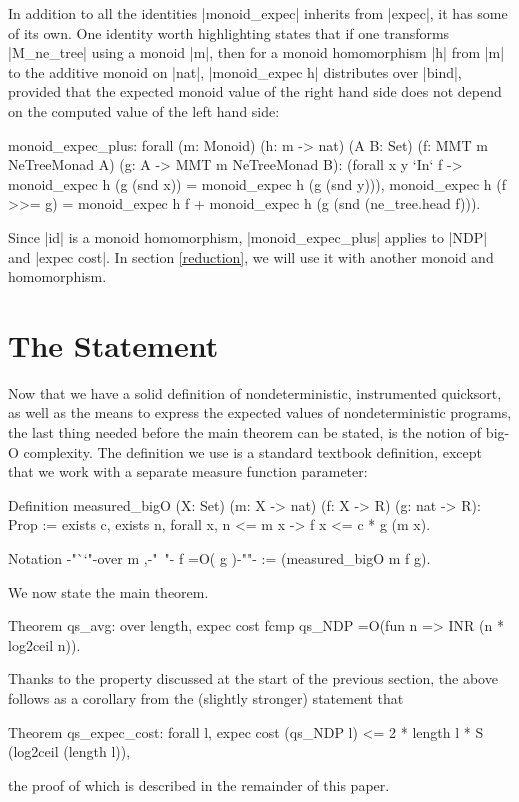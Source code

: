 \documentclass[runningheads]{llncs}
\begin{document}
In addition to all the identities |monoid_expec| inherits from |expec|, it has some of its own. One identity worth highlighting states that if one transforms |M_ne_tree| using a monoid |m|, then for a monoid homomorphism |h| from |m| to the additive monoid on |nat|, |monoid_expec h| distributes over |bind|, provided that the expected monoid value of the right hand side does not depend on the computed value of the left hand side:
\begin{code}
  monoid_expec_plus: forall (m: Monoid) (h: m -> nat) (A B: Set)
    (f: MMT m NeTreeMonad A) (g: A -> MMT m NeTreeMonad B):
    (forall x y `In` f -> monoid_expec h (g (snd x)) = monoid_expec h (g (snd y))),
    monoid_expec h (f >>= g) =
      monoid_expec h f + monoid_expec h (g (snd (ne_tree.head f))).
\end{code}
Since |id| is a monoid homomorphism, |monoid_expec_plus| applies to |NDP| and |expec cost|. In section \ref{reduction}, we will use it with another monoid and homomorphism.

\section{The Statement}
\label{statement}

Now that we have a solid definition of nondeterministic, instrumented quicksort, as well as the means to express the expected values of nondeterministic programs, the last thing needed before the main theorem can be stated, is the notion of big-O complexity. The definition we use is a standard textbook definition, except that we work with a separate measure function parameter:

\parbox{\textwidth}{\begin{code}
  Definition measured_bigO (X: Set)
    (m: X -> nat) (f: X -> R) (g: nat -> R): Prop
      := exists c, exists n, forall x, n <= m x -> f x <= c * g (m x).

  Notation {-"``"-}over m ,{-"\ "-} f =O( g ){-""-} := (measured_bigO m f g).
\end{code}}
We now state the main theorem.
\begin{code}
  Theorem qs_avg: over length,
    expec cost fcmp qs_NDP =O(fun n => INR (n * log2ceil n)).
\end{code}
Thanks to the property discussed at the start of the previous section, the above follows as a corollary from the (slightly stronger) statement that
\begin{code}
  Theorem qs_expec_cost:
    forall l, expec cost (qs_NDP l) <= 2 * length l * S (log2ceil (length l)),
\end{code}
the proof of which is described in the remainder of this paper.
\end{document}
